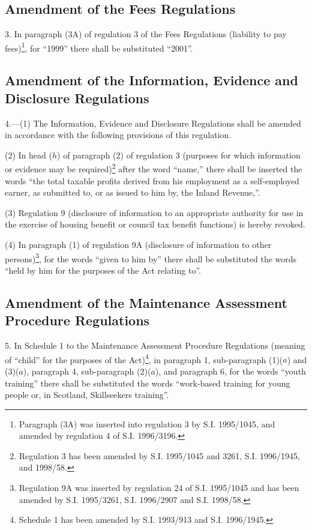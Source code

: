 \documentclass[12pt,a4paper]{article}
\begin{document}
\subsection[3. Amendment of the Fees Regulations]{Amendment of the Fees Regulations}

3.  In paragraph (3A) of regulation 3 of the Fees Regulations (liability to pay fees)\footnote{\frenchspacing Paragraph (3A) was inserted into regulation 3 by S.I. 1995/1045, and amended by regulation 4 of S.I. 1996/3196.}, for “1999” there shall be substituted “2001”.

\subsection[4. Amendment of the Information, Evidence and Disclosure Regulations]{Amendment of the Information, Evidence and Disclosure Regulations}

4.—(1) The Information, Evidence and Disclosure Regulations shall be amended in accordance with the following provisions of this regulation.

(2) In head ($h$) of paragraph (2) of regulation 3 (purposes for which information or evidence may be required)\footnote{\frenchspacing Regulation 3 has been amended by S.I. 1995/1045 and 3261, S.I. 1996/1945, and 1998/58.} after the word “name,” there shall be inserted the words “the total taxable profits derived from his employment as a self-employed earner, as submitted to, or as issued to him by, the Inland Revenue,”.

(3) Regulation 9 (disclosure of information to an appropriate authority for use in the exercise of housing benefit or council tax benefit functions) is hereby revoked.

(4) In paragraph (1) of regulation 9A (disclosure of information to other persons)\footnote{\frenchspacing Regulation 9A was inserted by regulation 24 of S.I. 1995/1045 and has been amended by S.I. 1995/3261, S.I. 1996/2907 and S.I. 1998/58.}, for the words “given to him by” there shall be substituted the words “held by him for the purposes of the Act relating to”.

\subsection[5. Amendment of the Maintenance Assessment Procedure Regulations]{\sloppy Amendment of the Maintenance Assessment Procedure Regulations}

5.  In Schedule 1 to the Maintenance Assessment Procedure Regulations (meaning of “child” for the purposes of the Act)\footnote{\frenchspacing Schedule 1 has been amended by S.I. 1993/913 and S.I. 1996/1945.}, in paragraph 1, sub-paragraph (1)($a$) and (3)($a$), paragraph 4, sub-paragraph (2)($a$), and paragraph 6, for the words “youth training” there shall be substituted the words “work-based training for young people or, in Scotland, Skillseekers training”.
\end{document}
